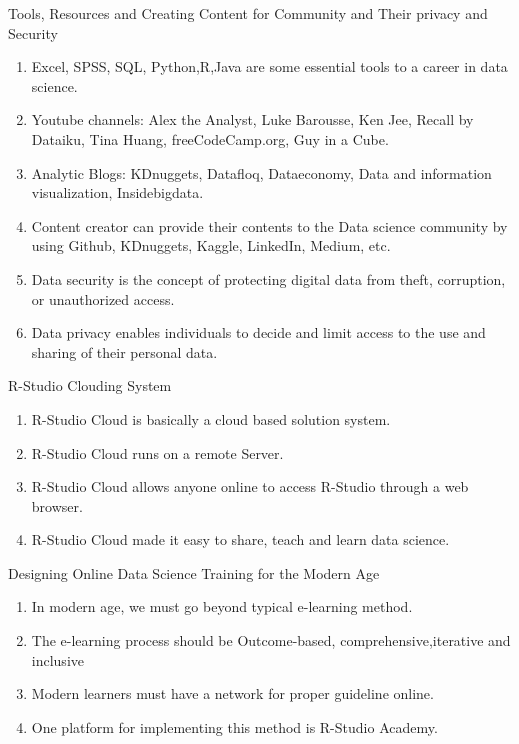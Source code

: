 \documentclass[aspectratio=169]{beamer}
\begin{document}
\begin{frame}{Tools, Resources and Creating Content for Community and Their privacy and Security}
	\begin{enumerate}
		\item Excel, SPSS, SQL, Python,R,Java are some essential tools to a career in data science.
		\item Youtube channels: Alex the Analyst, Luke Barousse, Ken Jee, Recall by Dataiku, Tina Huang, freeCodeCamp.org, Guy in a Cube.
		\item Analytic Blogs: KDnuggets, Datafloq, Dataeconomy, Data and information visualization, Insidebigdata.
		
		
		\item Content creator can provide their contents to the Data science community by using Github, KDnuggets, Kaggle, LinkedIn, Medium, etc.
		
		
		\item Data security is the concept of protecting digital data from theft, corruption, or unauthorized access.
		
		\item  Data privacy enables individuals to decide and limit access to the use and sharing of their personal data.
	\end{enumerate}
\end{frame}
\begin{frame}{R-Studio Clouding System}
	\begin{enumerate}
		\item R-Studio Cloud is basically a cloud based solution system.
		
		\item R-Studio Cloud runs on a remote Server.
		
		\item R-Studio Cloud allows anyone online to access R-Studio through a web browser.
		
		\item  R-Studio Cloud made it easy to share, teach and learn data science.
	\end{enumerate}
\end{frame}
\begin{frame}{ Designing Online Data Science Training for the Modern Age
	}
	\begin{enumerate}
		\item In modern age, we must go beyond typical e-learning method.
		
		\item The e-learning process should be Outcome-based, comprehensive,iterative and inclusive
		\item Modern learners must have a network for proper guideline online.
		
		
		\item One platform for implementing this method is R-Studio Academy.
		
		
	\end{enumerate}
\end{frame}
\end{document}
